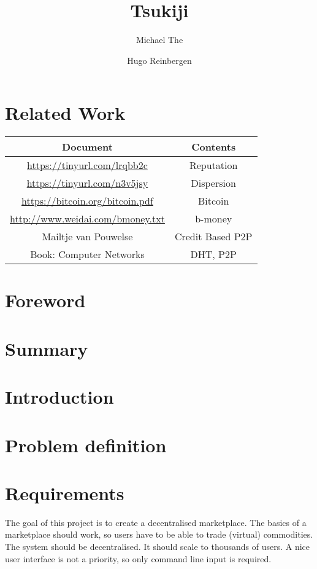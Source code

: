 \documentclass[]{article}
\title{Tsukiji}
\author{Michael The \and Hugo Reinbergen}
\begin{document}
\maketitle


\section{Related Work}
\begin{tabular}{|c|c|}
 \hline
 Document & Contents  \\
 \hline
 \url{https://tinyurl.com/lrqbb2c} & Reputation \\
 \url{https://tinyurl.com/n3v5jsy} & Dispersion \\
 \url{https://bitcoin.org/bitcoin.pdf} & Bitcoin \\
 \url{http://www.weidai.com/bmoney.txt} & b-money \\
 Mailtje van Pouwelse & Credit Based P2P \\
 Book: Computer Networks & DHT, P2P \\
 \hline
\end{tabular}


\section{Foreword}

\tableofcontents

\section{Summary}

\section{Introduction}

\section{Problem definition}

\section{Requirements}

The goal of this project is to create a decentralised marketplace.
The basics of a marketplace should work, so users have to be able to trade (virtual) commodities.
The system should be decentralised.
It should scale to thousands of users.
A nice user interface is not a priority, so only command line input is required.
\end{document}
